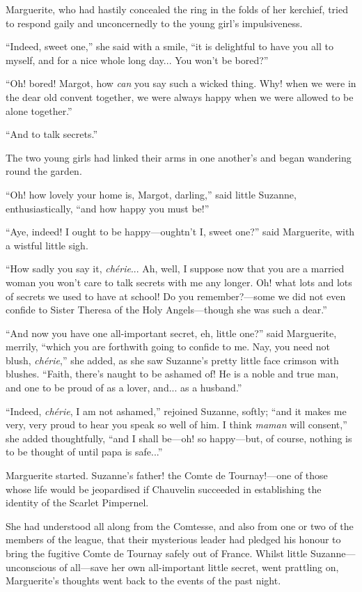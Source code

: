 \documentclass[paper=a5,BCOR=7mm,twoside,DIV=calc,12pt,usegeometry,chapterprefix,endperiod,headings=big]{scrbook}
\begin{document}
Marguerite, who had hastily concealed the ring in the folds of her kerchief, tried to respond gaily and unconcernedly to the young girl's impulsiveness.

\enquote{Indeed, sweet one,} she said with a smile, \enquote{it is delightful to have you all to myself, and for a nice whole long day... You won't be bored?}

\enquote{Oh! bored! Margot, how \textit{can} you say such a wicked thing. Why! when we were in the dear old convent together, we were always happy when we were allowed to be alone together.}

\enquote{And to talk secrets.}

The two young girls had linked their arms in one another's and began wandering round the garden.

\enquote{Oh! how lovely your home is, Margot, darling,} said little Suzanne, enthusiastically, \enquote{and how happy you must be!}

\enquote{Aye, indeed! I ought to be happy---oughtn't I, sweet one?} said Marguerite, with a wistful little sigh.

\enquote{How sadly you say it, \textit{chérie}... Ah, well, I suppose now that you are a married woman you won't care to talk secrets with me any longer. Oh! what lots and lots of secrets we used to have at school! Do you remember?---some we did not even confide to Sister Theresa of the Holy Angels---though she was such a dear.}

\enquote{And now you have one all-important secret, eh, little one?} said Marguerite, merrily, \enquote{which you are forthwith going to confide to me. Nay, you need not blush, \textit{chérie},} she added, as she saw Suzanne's pretty little face crimson with blushes. \enquote{Faith, there's naught to be ashamed of! He is a noble and true man, and one to be proud of as a lover, and... as a husband.}

\enquote{Indeed, \textit{chérie}, I am not ashamed,} rejoined Suzanne, softly; \enquote{and it makes me very, very proud to hear you speak so well of him. I think \textit{maman} will consent,} she added thoughtfully, \enquote{and I shall be---oh! so happy---but, of course, nothing is to be thought of until papa is safe...}

Marguerite started. Suzanne's father! the Comte de Tournay!---one of those whose life would be jeopardised if Chauvelin succeeded in establishing the identity of the Scarlet Pimpernel.

She had understood all along from the Comtesse, and also from one or two of the members of the league, that their mysterious leader had pledged his honour to bring the fugitive Comte de Tournay safely out of France. Whilst little Suzanne---unconscious of all---save her own  all-important little secret, went prattling on, Marguerite's thoughts went back to the events of the past night.
\end{document}
